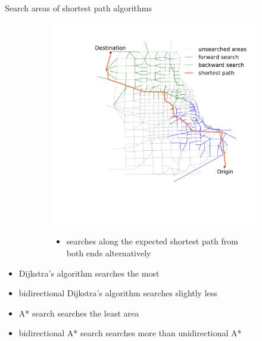 \documentclass[final]{beamer}
\begin{document}
\begin{frame}{ }
\begin{columns}[t]
\begin{column}{.4\linewidth}
\begin{block}{Search areas of shortest path algorithms}
\begin{figure}
\begin{subfigure}{.5\linewidth}
                        \includegraphics[width=\linewidth,trim=120px 280px 48px 60px,clip]{img/astar_bidirect}
                        \begin{itemize}
                        \centering
                            \item searches \alert{along the expected} shortest path from \alert{both ends alternatively}
                        \end{itemize}
                    \end{subfigure}
                \end{figure}
                \begin{itemize}
                    \itemsep.5em
                    \item Dijkstra's algorithm searches the most
                    \item bidirectional Dijkstra's algorithm searches slightly less
                    \item \alert{A* search searches the least area}
                    \item bidirectional A* search searches more than unidirectional A*
                \end{itemize}
            \end{block}


\end{column}
\end{columns}
\end{frame}
\end{document}
